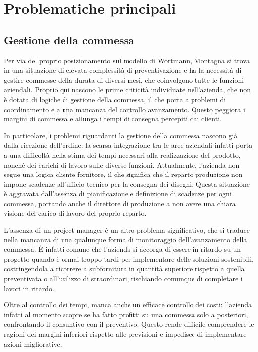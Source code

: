 \section{Problematiche principali}
\subsection{Gestione della commessa}
\begin{multicols}{2}
	Per via del proprio posizionamento sul modello di Wortmann, Montagna si trova in una situazione di elevata complessità di preventivazione e ha la necessità di gestire commesse della durata di diversi mesi, che coinvolgono tutte le funzioni aziendali. Proprio qui nascono le prime criticità individuate nell'azienda, che non è dotata di logiche di gestione della commessa, il che porta a problemi di coordinamento e a una mancanza del controllo avanzamento. Questo peggiora i margini di commessa e allunga i tempi di consegna percepiti dai clienti.

	In particolare, i problemi riguardanti la gestione della commessa nascono già dalla ricezione dell'ordine: la scarsa integrazione tra le aree aziendali infatti porta a una difficoltà nella stima dei tempi necessari alla realizzazione del prodotto, nonché dei carichi di lavoro sulle diverse funzioni. Attualmente, l'azienda non segue una logica cliente fornitore, il che significa che il reparto produzione non impone scadenze all'ufficio tecnico per la consegna dei disegni. Questa situazione è aggravata dall'assenza di pianificazione e definizione di scadenze per ogni commessa, portando anche il direttore di produzione a non avere una chiara visione del carico di lavoro del proprio reparto.

	L'assenza di un project manager è un altro problema significativo, che si traduce nella mancanza di una qualunque forma di monitoraggio dell'avanzamento della commessa. È infatti comune che l'azienda si accorga di essere in ritardo su un progetto quando è ormai troppo tardi per implementare delle soluzioni sostenibili, costringendola a ricorrere a subfornitura in quantità superiore rispetto a quella preventivata o all'utilizzo di straordinari, rischiando comunque di completare i lavori in ritardo.

	Oltre al controllo dei tempi, manca anche un efficace controllo dei costi: l'azienda infatti al momento scopre se ha fatto profitti su una commessa solo a posteriori, confrontando il consuntivo con il preventivo. Questo rende difficile comprendere le ragioni dei margini inferiori rispetto alle previsioni e impedisce di implementare azioni migliorative.
\end{multicols}

